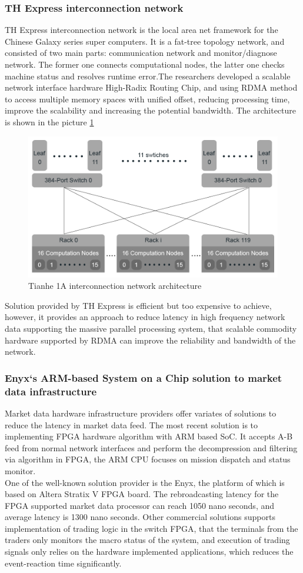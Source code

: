 \documentclass[11pt,openright,a4paper]{report}
\begin{document}
\subsubsection{TH Express interconnection network}
TH Express interconnection network is the local area net framework for the Chinese Galaxy series super computers. It is a fat-tree topology network, and consisted of two main parts: communication network and monitor/diagnose network\cite{yang2011tianhe}. The former one connects computational nodes, the latter one checks machine status and resolves runtime error.The researchers developed a scalable network interface hardware High-Radix Routing Chip, and using RDMA method to access multiple memory spaces with unified offset, reducing processing time, improve the scalability and increasing the potential bandwidth. The architecture is shown in the picture \ref{fig:tianhe1a}\\
\begin{figure}
	\centering
	\includegraphics[width=0.7\linewidth]{picture/tianhe1A.PNG}
	\caption{Tianhe 1A interconnection network architecture}
	\label{fig:tianhe1a}
\end{figure}
Solution provided by TH Express is efficient but too expensive to achieve, however, it provides an approach to reduce latency in high frequency network data supporting the massive parallel processing system, that scalable commodity hardware supported by RDMA can improve the reliability and bandwidth of the network.\\
\subsubsection{Enyx`s ARM-based System on a Chip solution to market data infrastructure}
Market data hardware infrastructure providers offer variates of solutions to reduce the latency in market data feed. The most recent solution is to implementing FPGA hardware algorithm with ARM based SoC. It accepts A-B feed from normal network interfaces and perform the decompression and filtering via algorithm in FPGA, the ARM CPU focuses on mission dispatch and status monitor.\\
One of the well-known solution provider is the Enyx, the platform of which is based on Altera Stratix V FPGA board. The rebroadcasting latency for the FPGA supported market data processor can reach 1050 nano seconds, and average latency is 1300 nano seconds\cite{ciscoWhitePaper}. Other commercial solutions supports implementation of trading logic in the switch FPGA, that the terminals from the traders only monitors the macro status of the system, and execution of trading signals only relies on the hardware implemented applications, which reduces the event-reaction time significantly.\\ 
\end{document}
